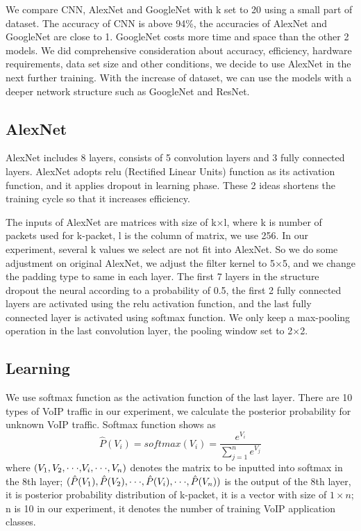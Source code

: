 \documentclass[conference]{IEEEtran}
\begin{document}
We compare CNN, AlexNet and GoogleNet with k set to 20 using a small part of dataset. The accuracy of CNN is above 94\%, the accuracies of AlexNet and GoogleNet are close to 1. GoogleNet costs more time and space than the other 2 models. We did comprehensive consideration about accuracy, efficiency, hardware requirements, data set size and other conditions, we decide to use AlexNet in the next further training. With the increase of dataset, we can use the models with a deeper network structure such as GoogleNet and ResNet.
\subsection{AlexNet}
AlexNet includes 8 layers, consists of 5 convolution layers and 3 fully connected layers. AlexNet adopts relu (Rectified Linear Units) function as its activation function, and it applies dropout in learning phase. These 2 ideas shortens the training cycle so that it increases efficiency.

The inputs of AlexNet are matrices with size of k$\times$l, where k is number of packets used for k-packet, l is the column of matrix, we use 256. In our experiment, several k values we select are not fit into AlexNet. So we do some adjustment on original AlexNet, we adjust the filter kernel to 5$\times$5, and we change the padding type to same in each layer. The first 7 layers in the structure dropout the neural according to a probability of 0.5, the first 2 fully connected layers are activated using the relu activation function, and the last fully connected layer is activated using softmax function. We only keep a max-pooling operation in the last convolution layer, the pooling window set to 2$\times$2.
\subsection{Learning}
We use softmax function as the activation function of the last layer. There are 10 types of VoIP traffic in our experiment, we calculate the posterior probability for unknown VoIP traffic. Softmax function shows as
\begin{equation}
\hat P({V_i}) = softmax({V_i}) = \frac{{{e^{{V_i}}}}}{{\sum\limits_{j = 1}^n {{e^{{V_j}}}} }}
\end{equation}
where $({V_1},{V_2},{\rm{\cdot\cdot\cdot,}}{V_i},{\rm{\cdot\cdot\cdot}},{V_n})$ denotes the matrix to be inputted into softmax in the 8th layer; $(\hat P({V_1}),\hat P({V_2}),{\rm{\cdot\cdot\cdot}},\hat P({V_i}),{\rm{\cdot\cdot\cdot}},\hat P({V_n}))$ is the output of the 8th layer, it is posterior probability distribution of k-packet, it is a vector with size of $1 \times n$; n is 10 in our experiment, it denotes the number of training VoIP application classes.
\end{document}
